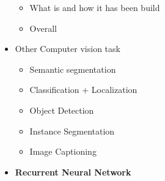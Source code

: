 \begin{itemize}
\begin{itemize}
        \item What is and how it has been build
        \item Overall
    \end{itemize}
    \item Other Computer vision task
    \begin{itemize}
        \item Semantic segmentation
        \item Classification + Localization
        \item Object Detection
        \item Instance Segmentation
        \item Image Captioning
    \end{itemize}
    \item \textbf{Recurrent Neural Network}
\end{itemize}

